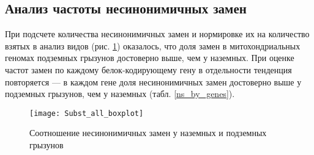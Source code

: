 \subsection{Анализ частоты несинонимичных замен}

При подсчете количества несинонимичных замен и нормировке их на количество взятых в анализ видов (рис. \ref{boxplot_NS}) оказалось, что доля замен в митохондриальных геномах подземных грызунов достоверно выше, чем у наземных.  При оценке частот замен по каждому белок-кодирующему гену в отдельности тенденция повторяется --- в каждом гене доля несинонимичных замен достоверно выше у подземных грызунов, чем у наземных (табл. \ref{ns_by_genes}).

\begin{figure}[h!]
\begin{center}
	\texttt{[image: Subst\_all\_boxplot]}
\end{center}
	\caption{Соотношение несинонимичных замен у наземных и подземных грызунов}\label{boxplot_NS}
\end{figure}



